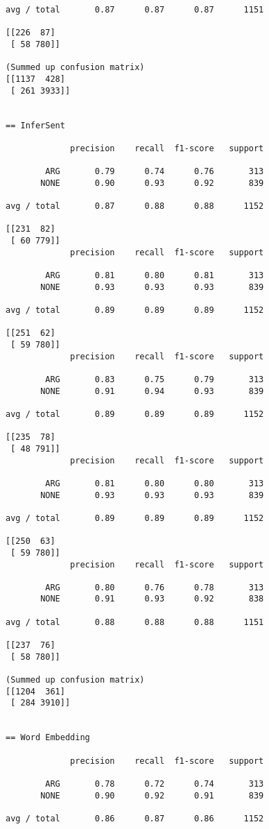 \begin{appendices}
\begin{verbatim}
avg / total       0.87      0.87      0.87      1151

[[226  87]
 [ 58 780]]

(Summed up confusion matrix)
[[1137  428]
 [ 261 3933]]


== InferSent

             precision    recall  f1-score   support

        ARG       0.79      0.74      0.76       313
       NONE       0.90      0.93      0.92       839

avg / total       0.87      0.88      0.88      1152

[[231  82]
 [ 60 779]]
             precision    recall  f1-score   support

        ARG       0.81      0.80      0.81       313
       NONE       0.93      0.93      0.93       839

avg / total       0.89      0.89      0.89      1152

[[251  62]
 [ 59 780]]
             precision    recall  f1-score   support

        ARG       0.83      0.75      0.79       313
       NONE       0.91      0.94      0.93       839

avg / total       0.89      0.89      0.89      1152

[[235  78]
 [ 48 791]]
             precision    recall  f1-score   support

        ARG       0.81      0.80      0.80       313
       NONE       0.93      0.93      0.93       839

avg / total       0.89      0.89      0.89      1152

[[250  63]
 [ 59 780]]
             precision    recall  f1-score   support

        ARG       0.80      0.76      0.78       313
       NONE       0.91      0.93      0.92       838

avg / total       0.88      0.88      0.88      1151

[[237  76]
 [ 58 780]]
 
(Summed up confusion matrix)
[[1204  361]
 [ 284 3910]]


== Word Embedding

             precision    recall  f1-score   support

        ARG       0.78      0.72      0.74       313
       NONE       0.90      0.92      0.91       839

avg / total       0.86      0.87      0.86      1152


\end{verbatim}
\end{appendices}

